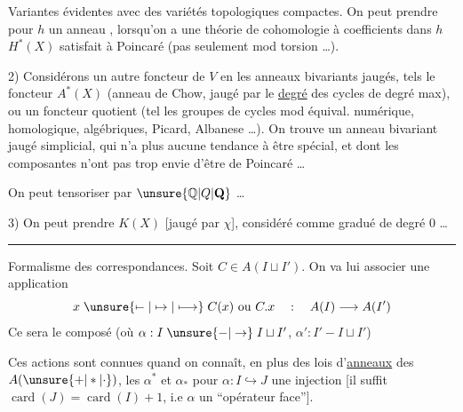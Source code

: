Variantes évidentes avec des variétés topologiques compactes.
On peut prendre pour $h$ un anneau , lorsqu'on a une théorie
de cohomologie à coefficients dans $h$  
 $H^*(X)$ satisfait à Poincaré  (pas seulement
mod torsion \ldots).

2) Considérons un autre foncteur de $V$ en les
anneaux bivariants jaugés, tels le foncteur
$A^*(X)$ (anneau de Chow,  jaugé par le
\uline{degré} des cycles de degré max), ou un foncteur
quotient (tel les groupes de cycles mod équival.
numérique, homologique, \inserted{$\tau$,} algébriques, Picard, Albanese \ldots).
On trouve un anneau bivariant jaugé simplicial, qui
n'a plus aucune tendance à être spécial, et dont
les composantes n'ont pas trop envie d'être de
Poincaré \ldots

On peut tensoriser par $\unsure{\mathbb{Q}|Q|\mathbf{Q}}$ \ldots

3) On peut prendre $K(X)$ [jaugé par $\chi$], considéré comme
gradué de degré 0 \ldots

\noindent\rule{.48\linewidth}{.3pt}

Formalisme des correspondances. Soit $C\in A(I\sqcup I')$. On
va lui associer une application
\[
x\mathrel{\unsure{\mapstochar\relbar|\mapsto|\longmapsto}} C(x)\ \text{ou}\ C.x\quad :\quad A(I)\longrightarrow A(I')
\]
Ce sera le composé (où $\alpha:I\mathrel{\unsure{-|\to}}I\sqcup I'$, $\alpha':I'\mathrel{-}I\sqcup I'$)

Ces actions sont connues quand on connaît, en plus
des lois d'\uline{anneaux} des $A(\unsure{+|*|\cdot})$, les $\alpha^*$ et $\alpha_*$
pour $\alpha:I\hookrightarrow J$ une injection [il suffit 
$\operatorname{card}(J)=\operatorname{card}(I)+1$, i.e $\alpha$ un ``opérateur face''].

